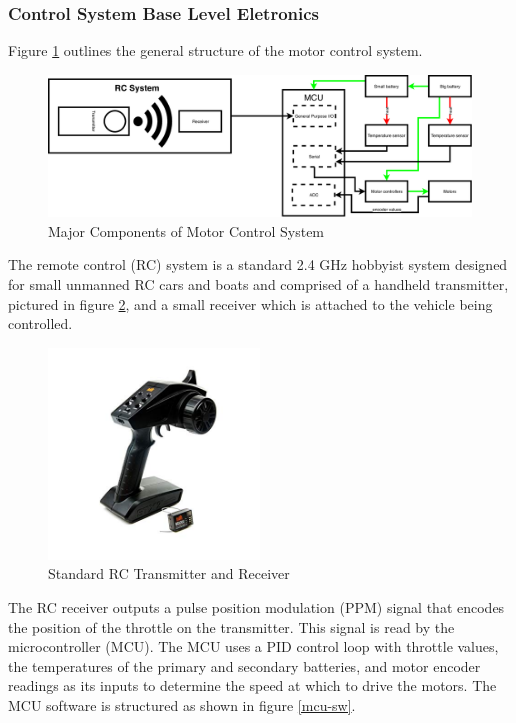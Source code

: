 \documentclass[titlepage, letterpaper,12pt]{article}
\begin{document}
\subsubsection{Control System Base Level Eletronics}
Figure \ref{ctrl-overview} outlines the general structure of the motor control system.

%
%
\begin{figure}[!htbp]\centering
\includegraphics[width=\linewidth]{rt.pdf}
\caption{Major Components of Motor Control System}
\label{ctrl-overview}
\end{figure}

The remote control (RC) system is a standard 2.4 GHz hobbyist system designed for small unmanned RC cars and boats and comprised of a handheld transmitter, pictured in figure \ref{ctrl-tx}, and a small receiver which is attached to the vehicle being controlled.

\begin{figure}[!htbp]\centering
\includegraphics[width=0.5\textwidth]{controller.jpg}
\caption{Standard RC Transmitter and Receiver}
\label{ctrl-tx}
\end{figure}

The RC receiver outputs a pulse position modulation (PPM) signal that encodes the position of the throttle on the transmitter. This signal is read by the microcontroller (MCU). The MCU uses a PID control loop with throttle values, the temperatures of the primary and secondary batteries, and motor encoder readings as its inputs to determine the speed at which to drive the motors. The MCU software is structured as shown in figure \ref{mcu-sw}.
\end{document}
